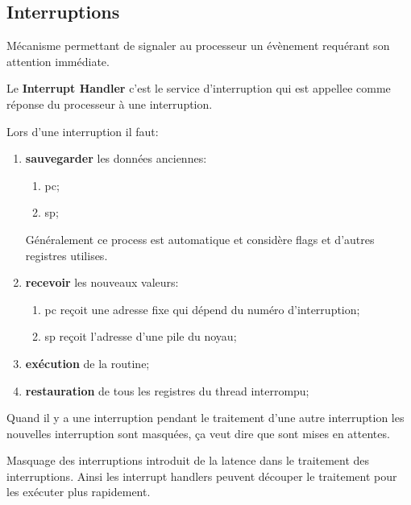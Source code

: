 \documentclass{article}
\begin{document}
\subsection{Interruptions}
\begin{definition}
    Mécanisme permettant de signaler au processeur un évènement requérant son attention immédiate.

    \begin{remark}
        Le \textbf{Interrupt Handler} c'est le service d'interruption qui est appellee comme réponse du processeur à une interruption.
    \end{remark}
    Lors d'une interruption il faut:
    \begin{enumerate}[]
        \item \textbf{sauvegarder} les données anciennes:
        \begin{enumerate}[noitemsep]
            \item pc;
            \item sp;
        \end{enumerate}
        Généralement ce process est automatique et considère flags et d'autres registres utilises.

        \item \textbf{recevoir} les nouveaux valeurs:
        \begin{enumerate}[noitemsep]
            \item pc reçoit une adresse fixe qui dépend du numéro d'interruption;
            \item sp reçoit l'adresse d'une pile du noyau; 
        \end{enumerate}

        \item \textbf{exécution} de la routine;
        \item \textbf{restauration} de tous les registres du thread interrompu;
    \end{enumerate}
    Quand il y a une interruption pendant le traitement d'une autre interruption les nouvelles interruption sont masquées, ça veut dire que sont mises en attentes.
    \begin{remark}
        Masquage des interruptions introduit de la latence dans le traitement des interruptions. Ainsi les interrupt handlers peuvent découper le traitement pour les exécuter plus rapidement.
    \end{remark}
\end{definition}
\end{document}

